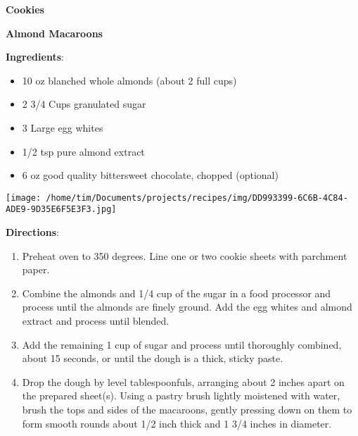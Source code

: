 \documentclass[11pt, twoside, openany]{book}
\begin{document}
{\newpage \LARGE \textbf{Cookies}} \label{cookies}\\
\noindent\begin{minipage}[t]{\linewidth}%
{\Large\textbf{Almond Macaroons}} \label{almond-macaroons}\hfill\textit{}\\
\noindent\begin{minipage}[t]{0.78\linewidth}%
\textbf{Ingredients}:\vspace{-3mm}
\begin{multicols}{2}
\begin{itemize}\setlength\itemsep{-1mm}
\item 10 oz blanched whole almonds (about 2 full cups)
\item 2 3/4 Cups granulated sugar
\item 3 Large egg whites
\item 1/2 tsp pure almond extract
\item 6 oz good quality bittersweet chocolate, chopped (optional)
\end{itemize}
\end{multicols}
\end{minipage}
\noindent\begin{minipage}[t]{0.18\linewidth}
\centering \strut\vspace*{-\baselineskip}\newline
\texttt{[image: /home/tim/Documents/projects/recipes/img/DD993399-6C6B-4C84-ADE9-9D35E6F5E3F3.jpg]}\\
\end{minipage}\vspace{3mm}
\textbf{Directions}:
\vspace{-3mm}\begin{enumerate}\setlength\itemsep{-1mm}
\item Preheat oven to 350 degrees. Line one or two cookie sheets with parchment paper.
\item Combine the almonds and 1/4 cup of the sugar in a food processor and process until the almonds are finely ground. Add the egg whites and almond extract and process until blended.
\item Add the remaining 1 cup of sugar and process until thoroughly combined, about 15 seconds, or until the dough is a thick, sticky paste.
\item Drop the dough by level tablespoonfuls, arranging about 2 inches apart on the prepared sheet(s). Using a pastry brush lightly moistened with water, brush the tops and sides of the macaroons, gently pressing down on them to form smooth rounds about 1/2 inch thick and 1 3/4 inches in diameter.

\end{enumerate}
\end{minipage}
\end{document}
